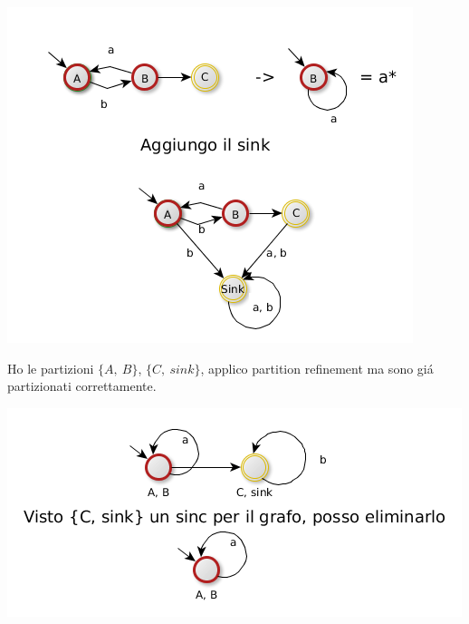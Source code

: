 \begin{center}
	\includegraphics[scale=0.5]{Chapters/Img/c02_07.png}\\
\end{center} 

Ho le partizioni $\{A,\ B\}$, $\{C,\ sink\}$, applico partition refinement ma sono gi\'a partizionati correttamente.

\begin{center}
	\includegraphics[scale=0.5]{Chapters/Img/c02_08.png}\\
\end{center} 